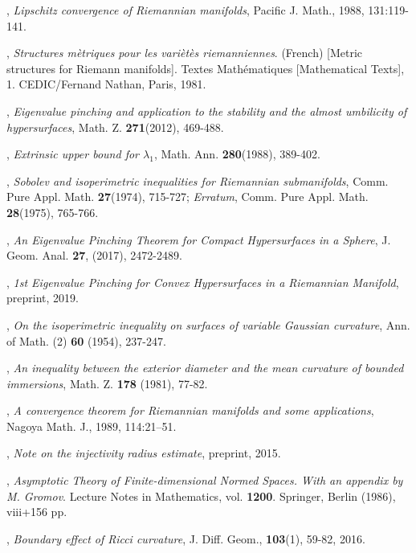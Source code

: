 \documentclass{amsart}
\numberwithin{equation}{section}
\theoremstyle{remark}
\renewcommand{\(}{\left(}
\renewcommand{\)}{\right)}
\renewcommand{\~}{\tilde}
\renewcommand{\-}{\overline}
\renewcommand{\l}{\lambda}
\begin{document}
\begin{thebibliography}{10}
, {\em Lipschitz convergence of Riemannian manifolds}, Pacific J. Math., 1988, 131:119-141.

, {\em Structures m\`etriques pour les vari\`et\`es riemanniennes}. (French) [Metric structures for Riemann manifolds]. Textes Math\'ematiques [Mathematical Texts], 1. CEDIC/Fernand Nathan,	Paris, 1981.

, {\em Eigenvalue pinching and application to the stability and the almost umbilicity of hypersurfaces}, Math. Z. {\bf 271}(2012), 469-488.

, {\em Extrinsic upper bound for $\l_1$},  Math. Ann. {\bf 280}(1988), 389-402.

, {\em Sobolev and isoperimetric inequalities for Riemannian submanifolds}, Comm. Pure Appl. Math. {\bf 27}(1974), 715-727; {\em Erratum}, Comm. Pure Appl. Math. {\bf 28}(1975), 765-766.

, {\em An Eigenvalue Pinching Theorem for Compact Hypersurfaces in a Sphere}, J. Geom. Anal. {\bf 27}, (2017), 2472-2489.

, {\em 1st Eigenvalue Pinching for Convex Hypersurfaces in a Riemannian Manifold}, preprint, 2019.


, {\em	On the isoperimetric inequality on surfaces of variable Gaussian curvature}, Ann. of Math. (2) {\bf 60} (1954), 237-247.

, {\em An inequality between the exterior diameter and the mean curvature of bounded immersions}, Math. Z. {\bf 178} (1981), 77-82.

, {\em A convergence theorem for Riemannian manifolds and some applications}, Nagoya Math. J., 1989, 114:21--51.


, {\em Note on the injectivity radius estimate}, preprint, 2015.

, {\em Asymptotic Theory of Finite-dimensional Normed Spaces. With an appendix by M. Gromov}. Lecture Notes in Mathematics, vol. {\bf 1200}. Springer, Berlin (1986), viii+156 pp.

, {\em Boundary effect of Ricci curvature}, J. Diff. Geom., {\bf 103}(1), 59-82, 2016.


\end{thebibliography}
\end{document}
